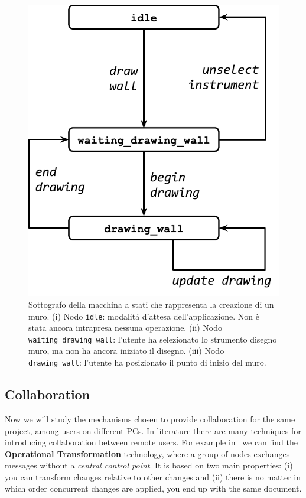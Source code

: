 \begin{figure}[!t]
\centering
\includegraphics[width=0.6\linewidth]{contents/images/uc_draw_wall}

\caption{Sottografo della macchina a stati che rappresenta la creazione di un muro. (i) Nodo \texttt{idle}: modalit\'a d'attesa dell'applicazione. Non è stata ancora intrapresa nessuna operazione. (ii) Nodo \texttt{waiting\_drawing\_wall}: l'utente ha selezionato lo strumento disegno muro, ma non ha ancora iniziato il disegno. (iii) Nodo \texttt{drawing\_wall}: l'utente ha posizionato il punto di inizio del muro.}
\label{fig_uc_draw_wall}
\end{figure}


\subsection{Collaboration}


Now we will study the mechanisms chosen to provide collaboration for the same project, among users on different PCs. In literature there are many techniques for introducing collaboration between remote users. For example in~\cite{Ellis:1989:CCG:66926.66963} we can find the \textbf{Operational Transformation} technology, where a group of nodes exchanges messages without a \textit{central control point}. It is based on two main properties: (i) you can transform changes relative to other changes and (ii) there is no matter in which order concurrent changes are applied, you end up with the same document.\\

